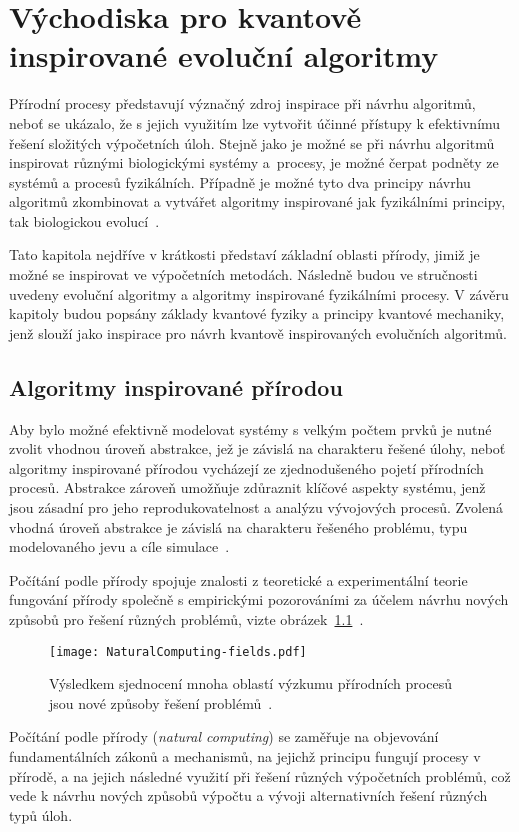 \chapter{Východiska pro kvantově inspirované evoluční algoritmy}
Přírodní procesy představují význačný zdroj inspirace při návrhu algoritmů, neboť se ukázalo, že s jejich využitím lze vytvořit účinné přístupy k efektivnímu řešení složitých výpočetních úloh.
Stejně jako je možné se při návrhu algoritmů inspirovat různými biologickými systémy a~procesy, je možné čerpat podněty ze systémů a procesů fyzikálních. 
Případně je možné tyto dva principy návrhu algoritmů zkombinovat a vytvářet algoritmy inspirované jak fyzikálními principy, tak biologickou evolucí~\cite{NaturalComputing,NaturalComputing-handbook}.

Tato kapitola nejdříve v krátkosti představí základní oblasti přírody, jimiž je možné se inspirovat ve výpočetních metodách. 
Následně budou ve stručnosti uvedeny evoluční algoritmy a algoritmy inspirované fyzikálními procesy. 
V závěru kapitoly budou popsány základy kvantové fyziky a principy kvantové mechaniky, jenž slouží jako inspirace pro návrh kvantově inspirovaných evolučních algoritmů. 

\section{Algoritmy inspirované přírodou}
Aby bylo možné efektivně modelovat systémy s velkým počtem prvků je nutné zvolit vhodnou úroveň abstrakce, jež je závislá na charakteru řešené úlohy, neboť algoritmy inspirované přírodou vycházejí ze zjednodušeného pojetí přírodních procesů. 
Abstrakce zároveň umožňuje zdůraznit klíčové aspekty systému, jenž jsou zásadní pro jeho reprodukovatelnost a analýzu vývojových procesů. 
Zvolená vhodná úroveň abstrakce je závislá na charakteru řešeného problému, typu modelovaného jevu a cíle simulace~\cite{FundamentalNatural}. 

Počítání podle přírody spojuje znalosti z teoretické a experimentální teorie fungování přírody společně s empirickými pozorováními za účelem návrhu nových způsobů pro řešení různých problémů, vizte obrázek~\ref{fig:natural-computing-fields}~\cite{FundamentalNatural}.
\begin{figure}[ht!]
    \centering
    \texttt{[image: NaturalComputing-fields.pdf]}
    \caption{Výsledkem sjednocení mnoha oblastí výzkumu přírodních procesů jsou nové způsoby řešení problémů~\cite{FundamentalNatural}.}
    \label{fig:natural-computing-fields}
\end{figure}Počítání podle přírody (\emph{natural computing}) se zaměřuje na objevování fundamentálních zákonů a mechanismů, na jejichž principu fungují procesy v přírodě, a na jejich následné využití při řešení různých výpočetních problémů, což vede k návrhu nových způsobů výpočtu a vývoji alternativních řešení různých typů úloh. 

